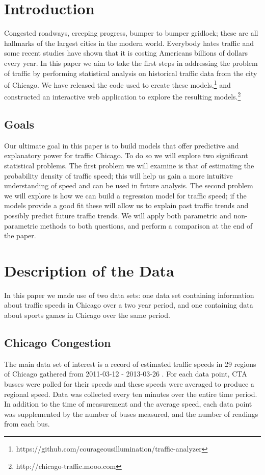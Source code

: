\documentclass[12pt]{article}
\begin{document}
\maketitle
\section{Introduction}
Congested roadways, creeping progress, bumper to bumper gridlock; these are all hallmarks of the largest cities in the modern world. Everybody hates traffic and some recent studies have shown that it is costing Americans billions of dollars every year. In this paper we aim to take the first steps in addressing the problem of traffic by performing statistical analysis on historical traffic data from the city of Chicago. We have released the code used to create these models,\footnote{https://github.com/courageousillumination/traffic-analyzer} and constructed an interactive web application to explore the resulting models.\footnote{http://chicago-traffic.mooo.com}
\subsection{Goals}
Our ultimate goal in this paper is to build models that offer predictive and explanatory power for traffic Chicago. To do so we will explore two significant statistical problems. The first problem we will examine is that of estimating the probability density of traffic speed; this will help us gain a more intuitive understanding of speed and can be used in future analysis. The second problem we will explore is how we can build a regression model for traffic speed; if the models provide a good fit these will allow us to explain past traffic trends and possibly predict future traffic trends. We will apply both parametric and non-parametric methods to both questions, and perform a comparison at the end of the paper.
\section{Description of the Data}
In this paper we made use of two data sets: one data set containing information about traffic speeds in Chicago over a two year period, and one containing data about sports games in Chicago over the same period.
\subsection{Chicago Congestion}
The main data set of interest is a record of estimated traffic speeds in 29 regions of Chicago gathered from 2011-03-12 - 2013-03-26 \cite{regiondataset}. For each data point, CTA busses were polled for their speeds and these speeds were averaged to produce a regional speed. Data was collected every ten minutes over the entire time period. In addition to the time of measurement and the average speed, each data point was supplemented by the number of buses measured, and the number of readings from each bus.
\end{document}
